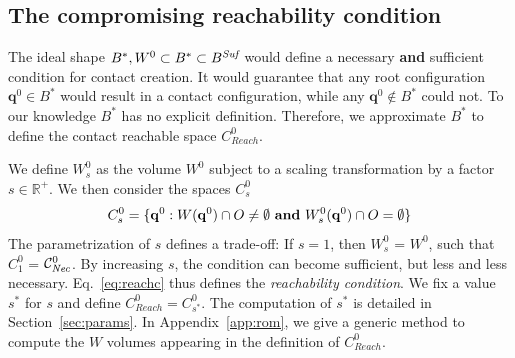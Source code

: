 \documentclass[journal]{IEEEtran}
\providecommand{\DIFaddtex}[1]{#1} %
\providecommand{\DIFdeltex}[1]{} %
\providecommand{\DIFaddbegin}{\protect\color{blue}} %
\providecommand{\DIFaddend}{\protect\color{black}} %
\providecommand{\DIFdelbegin}{\protect\cbdelete} %
\providecommand{\DIFdelend}{} %
\providecommand{\DIFadd}[1]{\texorpdfstring{\DIFaddtex{#1}}{#1}} %
\providecommand{\DIFdel}[1]{\texorpdfstring{\DIFdeltex{#1}}{}} %
\begin{document}
\subsection{The compromising reachability condition}
\label{sec:scaling}
The ideal shape \DIFdelbegin \DIFdel{$B^*, W^0 \subset B* \subset B^{\textrm{\it Suf}}$ that defines }\DIFdelend \DIFaddbegin \DIFadd{$B^*, W^0 \subset B^* \subset B^{\textrm{\it Suf}}$ would define }\DIFaddend a necessary \textbf{and} sufficient condition for contact creation\DIFaddbegin \DIFadd{. 
It would guarantee that any root configuration $\mathbf{q}^{0} \in B^*$ would result in a contact configuration, while any $\mathbf{q}^{0} \notin B^*$ could not.
To our knowledge  $B^*$ }\DIFaddend has no explicit definition.
Therefore, we approximate $B^*$ to define the contact reachable space $C_{Reach}^0$.

We define $W^0_s$ as the volume $W^0$ subject to a scaling transformation by a factor $s \in \mathbb{R}^+$.
%
We then consider the spaces $C_{s}^0$
 \begin{equation}
 \label{eq:reachc}
C^0_s = \{ \mathbf{q}^0 : W(\mathbf{q}^{0}) \cap O \neq \emptyset \textrm{ \textbf{and}}\ W^0_s(\mathbf{q}^{0}) \cap O = \emptyset \} %
\end{equation}
%
The parametrization of $s$ defines a trade-off:
If $s=1$, then $W^0_s$ = $W^0$, such that $C_1^0$ = $\mathcal{C}^0_{\textrm{\it Nec}}$.
By increasing $s$, the condition can become sufficient, but less and less necessary.  
Eq.~\ref{eq:reachc} thus defines the \textit{reachability condition}. We fix a value $s^*$ for $s$ and define  $C_{Reach}^0 = C^0_{s^*}$.
The computation of $s^*$ is detailed in Section~\ref{sec:params}. 
In Appendix~\ref{app:rom}, we give a generic method to compute the $W$ volumes appearing in the definition of $C_{Reach}^0$.
\end{document}
